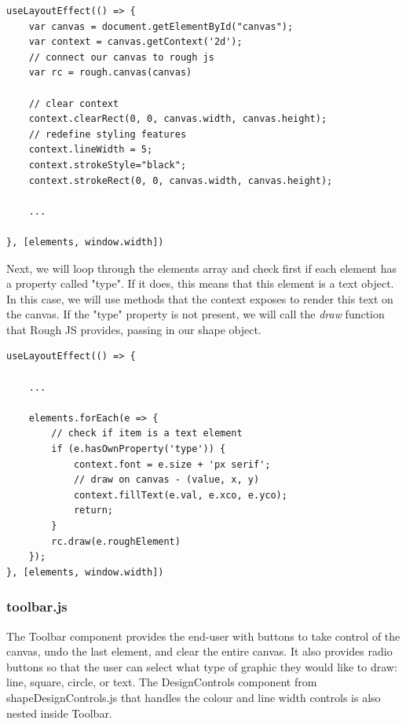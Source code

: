 \begin{enumerate}
    \begin{verbatim}
useLayoutEffect(() => {
    var canvas = document.getElementById("canvas");
    var context = canvas.getContext('2d');
    // connect our canvas to rough js 
    var rc = rough.canvas(canvas)
    
    // clear context
    context.clearRect(0, 0, canvas.width, canvas.height);
    // redefine styling features
    context.lineWidth = 5;
    context.strokeStyle="black";
    context.strokeRect(0, 0, canvas.width, canvas.height);
    
    ...
    
}, [elements, window.width])  
    \end{verbatim}
    
    Next, we will loop through the elements array and check first if each element has a property called "type". If it does, this means that this element is a text object. In this case, we will use methods that the context exposes to render this text on the canvas. \newline
    If the "type" property is not present, we will call the \textit{draw} function that Rough JS provides, passing in our shape object. 
    
    \begin{verbatim}
useLayoutEffect(() => {
    
    ...
    
    elements.forEach(e => {
        // check if item is a text element
        if (e.hasOwnProperty('type')) {
            context.font = e.size + 'px serif';
            // draw on canvas - (value, x, y)
            context.fillText(e.val, e.xco, e.yco);
            return;
        }
        rc.draw(e.roughElement)
    });
}, [elements, window.width])    
    \end{verbatim}
    
\end{enumerate}

\subsubsection{toolbar.js}
The Toolbar component provides the end-user with buttons to take control of the canvas, undo the last element, and clear the entire canvas. It also provides radio buttons so that the user can select what type of graphic they would like to draw: line, square, circle, or text. The DesignControls component from shapeDesignControls.js that handles the colour and line width controls is also nested inside Toolbar.

